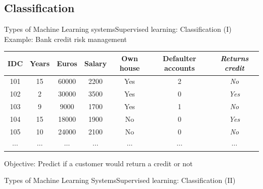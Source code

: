\documentclass[10pt,compress]{beamer} %
\begin{document}
\subsection{Classification}
\begin{frame}{Types of Machine Learning systems}{Supervised learning: Classification (I)}
	Example: Bank credit risk management

	\begin{center}
	\begin{tabular}{ccccccc}\hline
		 IDC & Years& Euros & Salary & Own house & Defaulter accounts & \textit{Returns credit} \\\hline
		 101 & 15   & 60000 & 2200   & Yes       & 2                  & \textit{No} \\
		 102 & 2    & 30000 & 3500   & Yes       & 0                  & \textit{Yes} \\
		 103 & 9    & 9000  & 1700   & Yes       & 1                  & \textit{No} \\
		 104 & 15   & 18000 & 1900   & No        & 0                  & \textit{Yes} \\
		 105 & 10   & 24000 & 2100   & No        & 0                  & \textit{No} \\
		 $\cdots$ & $\cdots$ & $\cdots$ & $\cdots$   & $\cdots$  & $\cdots$ & $\cdots$ \\
		 \hline
	 \end{tabular}
	 \end{center}

	Objective: Predict if a customer would return a credit or not
\end{frame}

\begin{frame}{Types of Machine Learning Systems}{Supervised learning: Classification (II)}
	\begin{figure}[h]
	\centering{
		\resizebox{\textwidth}{!}{}}
	\end{figure}
\end{frame}
\end{document}
